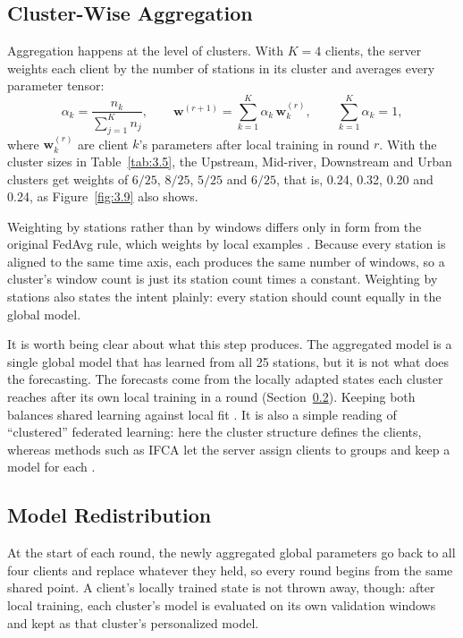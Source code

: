 \subsection{Cluster-Wise Aggregation}
\label{sec:3.12.4}

Aggregation happens at the level of clusters. With $K = 4$ clients, the server
weights each client by the number of stations in its cluster and averages every
parameter tensor:
\begin{equation}
  \alpha_k = \frac{n_k}{\sum_{j=1}^{K} n_j}, \qquad
  \mathbf{w}^{(r+1)} = \sum_{k=1}^{K} \alpha_k\, \mathbf{w}_k^{(r)}, \qquad
  \sum_{k=1}^{K} \alpha_k = 1,
  \label{eq:3.7}
\end{equation}
where $\mathbf{w}_k^{(r)}$ are client $k$'s parameters after local training in
round $r$. With the cluster sizes in Table~\ref{tab:3.5}, the Upstream,
Mid-river, Downstream and Urban clusters get weights of $6/25$, $8/25$, $5/25$
and $6/25$, that is, 0.24, 0.32, 0.20 and 0.24, as Figure~\ref{fig:3.9} also
shows.

Weighting by stations rather than by windows differs only in form from the
original FedAvg rule, which weights by local examples \cite{McMahan2017}.
Because every station is aligned to the same time axis, each produces the same
number of windows, so a cluster's window count is just its station count times a
constant. Weighting by stations also states the intent plainly: every station
should count equally in the global model.

It is worth being clear about what this step produces. The aggregated model is a
single global model that has learned from all 25 stations, but it is not what
does the forecasting. The forecasts come from the locally adapted states each
cluster reaches after its own local training in a round
(Section~\ref{sec:3.12.5}). Keeping both balances shared learning against local
fit \cite{Zhu2021}. It is also a simple reading of ``clustered'' federated
learning: here the cluster structure defines the clients, whereas methods such
as IFCA let the server assign clients to groups and keep a model for each
\cite{Ghosh2021}.

\subsection{Model Redistribution}
\label{sec:3.12.5}

At the start of each round, the newly aggregated global parameters go back to
all four clients and replace whatever they held, so every round begins from the
same shared point. A client's locally trained state is not thrown away, though:
after local training, each cluster's model is evaluated on its own validation
windows and kept as that cluster's personalized model.

